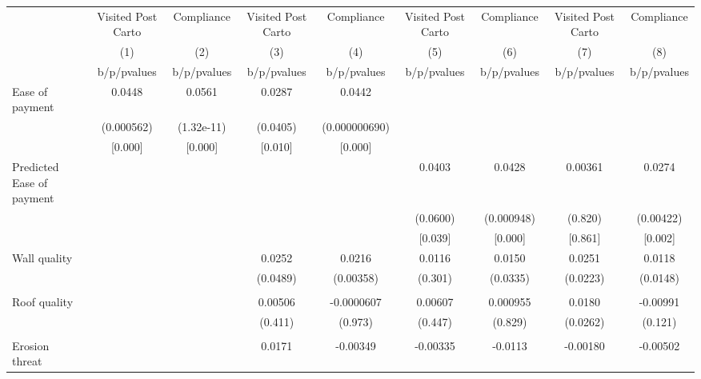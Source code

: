 {
\def\sym#1{\ifmmode^{#1}\else\(^{#1}\)\fi}
\begin{tabular}{l*{8}{c}}
\toprule
                &\multicolumn{1}{c}{Visited Post Carto}&\multicolumn{1}{c}{Compliance}&\multicolumn{1}{c}{Visited Post Carto}&\multicolumn{1}{c}{Compliance}&\multicolumn{1}{c}{Visited Post Carto}&\multicolumn{1}{c}{Compliance}&\multicolumn{1}{c}{Visited Post Carto}&\multicolumn{1}{c}{Compliance}\\
                &\multicolumn{1}{c}{(1)}&\multicolumn{1}{c}{(2)}&\multicolumn{1}{c}{(3)}&\multicolumn{1}{c}{(4)}&\multicolumn{1}{c}{(5)}&\multicolumn{1}{c}{(6)}&\multicolumn{1}{c}{(7)}&\multicolumn{1}{c}{(8)}\\
                &b/p/pvalues&b/p/pvalues&b/p/pvalues&b/p/pvalues&b/p/pvalues&b/p/pvalues&b/p/pvalues&b/p/pvalues\\
\midrule
Ease of payment &   0.0448&   0.0561&   0.0287&   0.0442&         &         &         &         \\
                &(0.000562)&(1.32e-11)& (0.0405)&(0.000000690)&         &         &         &         \\
                &  [0.000]&  [0.000]&  [0.010]&  [0.000]&         &         &         &         \\
Predicted Ease of payment&         &         &         &         &   0.0403&   0.0428&  0.00361&   0.0274\\
                &         &         &         &         & (0.0600)&(0.000948)&  (0.820)&(0.00422)\\
                &         &         &         &         &  [0.039]&  [0.000]&  [0.861]&  [0.002]\\
Wall quality    &         &         &   0.0252&   0.0216&   0.0116&   0.0150&   0.0251&   0.0118\\
                &         &         & (0.0489)&(0.00358)&  (0.301)& (0.0335)& (0.0223)& (0.0148)\\
                &         &         &         &         &         &         &         &         \\
Roof quality    &         &         &  0.00506&-0.0000607&  0.00607& 0.000955&   0.0180& -0.00991\\
                &         &         &  (0.411)&  (0.973)&  (0.447)&  (0.829)& (0.0262)&  (0.121)\\
                &         &         &         &         &         &         &         &         \\
Erosion threat  &         &         &   0.0171& -0.00349& -0.00335&  -0.0113& -0.00180& -0.00502\\

\end{tabular}}
